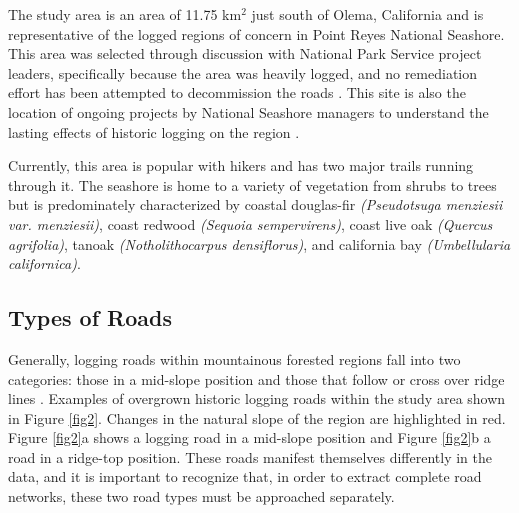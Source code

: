 \documentclass[remotesensing,article,accept,pdftex,moreauthors]{Definitions/mdpi}
\begin{document}
The study area is an area of 11.75 km$^2$ just south of Olema, California and is representative of the logged regions of concern in Point Reyes National Seashore. This area was selected through discussion with National Park Service project leaders, specifically because the area was heavily logged, and no remediation effort has been attempted to decommission the roads \cite{becker}. This site is also the location of ongoing projects by National Seashore managers to understand the lasting effects of historic logging on the region \cite{becker}.

Currently, this area is popular with hikers and has two major trails running through it. The seashore is home to a variety of vegetation from shrubs to trees but is predominately characterized by coastal douglas-fir {\it (Pseudotsuga menziesii var. menziesii)}, coast redwood {\it (Sequoia sempervirens)}, coast live oak {\it (Quercus agrifolia)}, tanoak {\it (Notholithocarpus densiflorus)}, and california bay {\it (Umbellularia californica)}.


\subsection{Types of Roads}
Generally, logging roads within mountainous forested regions fall into two categories: those in a mid-slope position and those that follow or cross over ridge lines \cite{sherba}. Examples of overgrown historic logging roads within the study area shown in Figure \ref{fig2}. Changes in the natural slope of the region are highlighted in red. Figure \ref{fig2}a shows a logging road in a mid-slope position and Figure \ref{fig2}b a road in a ridge-top position. These roads manifest themselves differently in the data, and it is important to recognize that, in order to extract complete road networks, these two road types must be approached separately.
\end{document}
